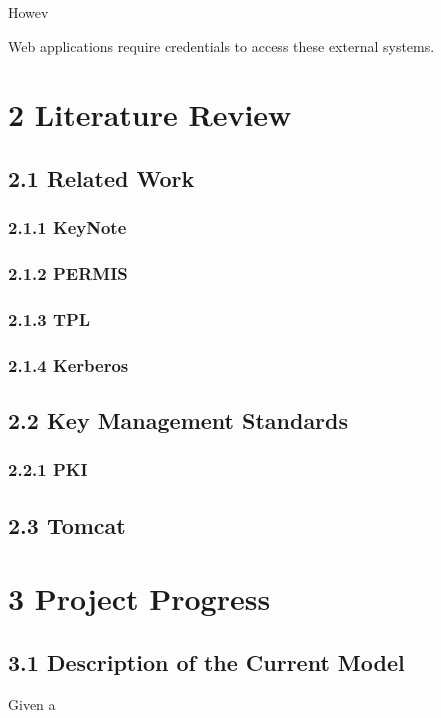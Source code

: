 \documentclass[11pt, a4paper, twoside, openright, notitlepage]{report}
\begin{document}
Howev


Web applications require credentials to access these external systems.  








\section*{2 Literature Review}
\subsection*{2.1 Related Work}

\subsubsection*{2.1.1 KeyNote}
\subsubsection*{2.1.2 PERMIS}
\subsubsection*{2.1.3 TPL}
\subsubsection*{2.1.4 Kerberos}

\subsection*{2.2 Key Management Standards}
\subsubsection*{2.2.1 PKI}

\subsection*{2.3 Tomcat}



\section*{3 Project Progress}
\subsection*{3.1 Description of the Current Model}
Given a 
\end{document}
